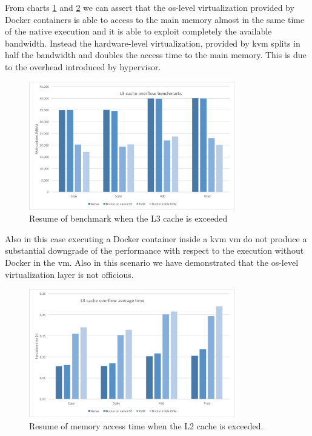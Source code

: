 From charts \ref{img:measurements-storage-results-l3Capacity} and \ref{img:measurements-storage-results-l3Time}
we can assert that the \acs{os}-level virtualization provided by Docker containers is able to access
to the main memory almost in the same time of the native execution and it is able to exploit completely
the available bandwidth. Instead the hardware-level virtualization, provided by \ac{kvm} splits in half
the bandwidth and doubles the access time to the main memory. This is due to the overhead introduced by
hypervisor.

\begin{figure}
	\centering{}
	\includegraphics[width=0.8\textwidth]{chapters/measurements/images/storage-l3-capacity.png}
	\caption[Storage - overflow L3 cache]{Resume of benchmark when the L3 cache is exceeded}
	\label{img:measurements-storage-results-l3Capacity}
\end{figure}

Also in this case executing a Docker container inside a \ac{kvm} \ac{vm} do not produce a substantial
downgrade of the performance with respect to the execution without Docker in the \ac{vm}. Also in this
scenario we have demonstrated that the \acs{os}-level virtualization layer is not officious.

\begin{figure}
	\centering{}
	\includegraphics[width=0.8\textwidth]{chapters/measurements/images/storage-l3-time.png}
	\caption[Storage - access time L2 cache exceeded]{Resume of memory access time when the L2
		cache is exceeded.}
	\label{img:measurements-storage-results-l3Time}
\end{figure}

